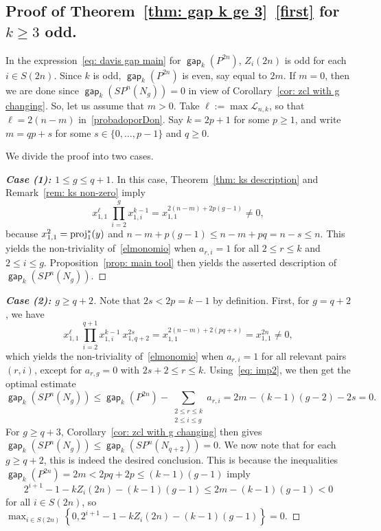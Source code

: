\documentclass[amscd,amssymb,verbatim,10pt]{amsart}
\numberwithin{equation}{section}
\theoremstyle{plain}
\theoremstyle{definition}
\DeclareMathOperator{\gap}{{\mathsf{gap}}}
\DeclareMathOperator{\proj}{{\textup{proj}}}
\begin{document}
\subsection{Proof of Theorem~\ref{thm: gap k ge 3}~\eqref{first} for $k\ge 3$ odd.}\label{subsec: odd k proof}
    In the expression~\eqref{eq: davis gap main} for $\gap_k(P^{2n})$, $Z_i(2n)$ is odd for each $i\in S(2n)$. Since $k$ is odd, $\gap_k(P^{2n})$ is even, say equal to $2m$. If $m=0$, then we are done since $\gap_k(SP^n(N_g))=0$ in view of Corollary~\ref{cor: zcl with g changing}.    So, let us assume that $m>0$. Take  $\ell:=\max\mathcal{L}_{n,k}$, so that $\ell=2(n-m)$ in~\eqref{probadoporDon}. Say $k=2p+1$ for some $p\ge 1$, and write $m=qp+s$ for some $s\in\{0,\ldots,p-1\}$ and $q\ge 0$. 

We divide the proof into two cases.

\begin{proof}[\textbf{Case (1): $1\le g\le q+1$}]
    In this case, Theorem~\ref{thm: ks description} and Remark~\ref{rem: ks non-zero} imply
    \[
     x_{1,1}^{\ell} \ \prod_{i=2}^gx_{1,i}^{k-1}=x_{1,1}^{2(n-m)+2p(g-1)} \ne 0,
    \]
because $x_{1,1}^{2}=\proj_1^*(y)$ and $n-m+p(g-1) \le n-m+pq=n-s\le n$. This yields the non-triviality of~\eqref{elmonomio} when $a_{r,i}=1$ for all $2\leq r\leq k$ and $2\leq i\leq g$. Proposition~\ref{prop: main tool} then yields the asserted description of $\gap_k(SP^n(N_g))$.
\end{proof}

\begin{proof}[\textbf{Case (2): $g\ge q+2$}]
Note that $2s<2p=k-1$ by definition. First, for $g=q+2$, we have
\[
x_{1,1}^{\ell}\ \prod_{i=2}^{q+1}x_{1,i}^{k-1} \ x_{1,q+2}^{2s} = x_{1,1}^{2(n-m)+2(pq+s)}=x_{1,1}^{2n}\ne 0,
\]
which yields the non-triviality of~\eqref{elmonomio} when $a_{r,i}=1$ for all relevant pairs $(r,i)$, except for $a_{r,g}=0$ with $2s+2\leq r\leq k$. Using~\eqref{eq: imp2}, we then get the optimal estimate
\[
\gap_k(SP^n(N_g))\le\gap_k(P^{2n})-\sum_{\substack{2\le r\le k\\ 2\le i \le g}}a_{r,i}=2m-(k-1)(g-2)-2s=0.
\]
For $g\ge q+3$, Corollary~\ref{cor: zcl with g changing} then gives $\gap_k(SP^n(N_g))\le\gap_k(SP^n(N_{q+2}))=0$. We now note that for each $g\ge q+2$, this is indeed the desired conclusion. This is because the inequalities $\gap_k(P^{2n})=2m<2pq+2p\le(k-1)(g-1)$ imply
\[
2^{i+1}-1-kZ_i(2n)-(k-1)(g-1)\le 2m-(k-1)(g-1) < 0
\]
for all $i\in S(2n)$, so $\max_{i\in S(2n)}\left\{0, 2^{i+1}-1-kZ_i(2n)-(k-1)(g-1)\right\}=0$.
\end{proof}
\end{document}
